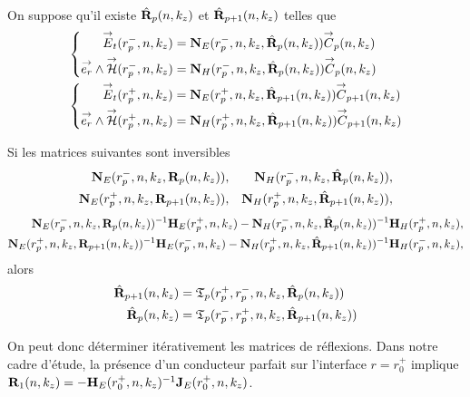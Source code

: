     \begin{prop}%
      \label{prop:cylindre:synthese:reflexion}{}~

      On suppose qu'il existe \(\hat{\mathbf{R}}_{p}(n,k_z)\) et \(\hat{\mathbf{R}}_{p+1}(n,k_z)\) telles que 
      \begin{align*}
      &\left\lbrace\begin{aligned}
        {\overset{\rightarrow}{E}}_t(r_{p}^-,n,k_z) &= \mathbf{N}_{E}(r_p^-,n,k_z,\hat{\mathbf{R}}_{p}(n,k_z)){\overset{\rightarrow}{C}}_{p}(n,k_z)
        \\
        {\overset{\rightarrow}{e_r}}\wedge{\overset{\rightarrow}{\mathcal{H}}}(r_{p}^-,n,k_z) &= \mathbf{N}_{H}(r_p^-,n,k_z,\hat{\mathbf{R}}_{p}(n,k_z)){\overset{\rightarrow}{C}}_{p}(n,k_z)
        \end{aligned}
      \right.
      \\
      &\left\lbrace\begin{aligned}
        {\overset{\rightarrow}{E}}_t(r_{p}^+,n,k_z) &= \mathbf{N}_{E}(r_p^+,n,k_z,\hat{\mathbf{R}}_{p+1}(n,k_z)){\overset{\rightarrow}{C}}_{p+1}(n,k_z)
        \\
        {\overset{\rightarrow}{e_r}}\wedge{\overset{\rightarrow}{\mathcal{H}}}(r_{p}^+,n,k_z) &= \mathbf{N}_{H}(r_p^+,n,k_z,\hat{\mathbf{R}}_{p+1}(n,k_z)){\overset{\rightarrow}{C}}_{p+1}(n,k_z)
        \end{aligned}
      \right.      
      \end{align*}

      Si les matrices suivantes sont inversibles
      \begin{align*}
        \mathbf{N}_{E}(r_p^-,n,k_z,\mathbf{R}_{p}(n,k_z)), && \mathbf{N}_{H}(r_p^-,n,k_z,\hat{\mathbf{R}}_{p}(n,k_z)),
        \\
        \mathbf{N}_{E}(r_p^+,n,k_z,\mathbf{R}_{p+1}(n,k_z)), && \mathbf{N}_{H}(r_p^+,n,k_z,\hat{\mathbf{R}}_{p+1}(n,k_z)),
      \end{align*}
      \begin{align*}
        \mathbf{N}_{E}(r_p^-,n,k_z,\mathbf{R}_{p}(n,k_z))^{-1}\mathbf{H}_{E}(r_p^+,n,k_z) - \mathbf{N}_{H}(r_p^-,n,k_z,\hat{\mathbf{R}}_{p}(n,k_z))^{-1}\mathbf{H}_{H}(r_p^+,n,k_z),
        \\
        \mathbf{N}_{E}(r_p^+,n,k_z,\mathbf{R}_{p+1}(n,k_z))^{-1}\mathbf{H}_{E}(r_p^-,n,k_z) - \mathbf{N}_{H}(r_p^+,n,k_z,\hat{\mathbf{R}}_{p+1}(n,k_z))^{-1}\mathbf{H}_{H}(r_p^-,n,k_z),
      \end{align*}
      alors
      \begin{align*}
        \hat{\mathbf{R}}_{p+1}(n,k_z) &= \mathfrak{T}_p(r_p^+,r_p^-,n,k_z,\hat{\mathbf{R}}_{p}(n,k_z))
        \\
        \hat{\mathbf{R}}_{p}(n,k_z) &= \mathfrak{T}_p(r_p^-,r_p^+,n,k_z,\hat{\mathbf{R}}_{p+1}(n,k_z))
      \end{align*}
    \end{prop}

    On peut donc déterminer itérativement les matrices de réflexions. Dans notre cadre d'étude, la présence d'un conducteur parfait sur l'interface \(r=r_0^+\) implique \(\mathbf{R}_{1}(n,k_z) = -\mathbf{H}_E(r_0^+,n,k_z)^{-1}\mathbf{J}_E(r_0^+,n,k_z)\).

